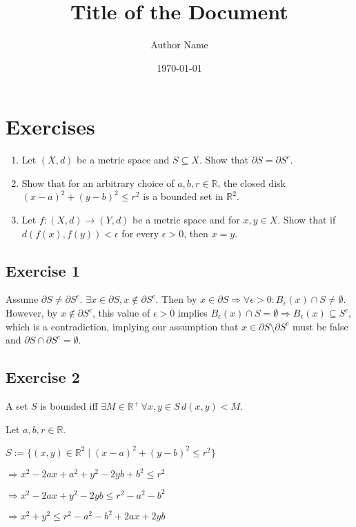 \documentclass{article}
\title{\textbf{Title of the Document}}
\author{Author Name}
\date{\today}
\theoremstyle{definition}
\numberwithin{equation}{section}
\begin{document}
\maketitle
\tableofcontents
\newpage
\section{Exercises}
\begin{enumerate}
    \item Let $(X,d)$ be a metric space and $S \subseteq X$. Show that $\partial S = \partial S^c$.
    \item Show that for an arbitrary choice of \(a, b, r \in \mathbb{R}\), the closed disk \((x - a)^2 + (y - b)^2 \le r^2\) is a bounded set in \(\mathbb{R}^2\).
    \item Let $f:(X,d) \to (Y,d)$ be a metric space and for \(x,y \in X\). Show that if $d(f(x), f(y)) < \epsilon$ for every \(\epsilon > 0\), then \( x = y\).
\end{enumerate}

\subsection*{Exercise 1}
Assume $\partial S \neq \partial S^c$. $\exists x \in \partial S, x \notin \partial S^c$. Then by \(x \in \partial S \Rightarrow \forall \epsilon > 0: B_\epsilon(x) \cap S \neq \emptyset \). However, by \(x \notin \partial S^c\), this value of \(\epsilon > 0\) implies \(B_\epsilon(x) \cap S = \emptyset \Rightarrow B_\epsilon(x) \subseteq S^c\), which is a contradiction, implying our assumption that $x \in \partial S \setminus \partial S^c$ must be false and $\partial S \cap \partial S^c = \emptyset$.

\subsection*{Exercise 2}
A set \(S\) is bounded iff \(\exists M \in \mathbb{R}^+ \, \forall x,y \in S \, d(x,y) < M\).

Let \(a, b, r \in \mathbb{R}\). 

$
S := \{(x,y) \in \mathbb{R}^2 \mid (x-a)^2 + (y-b)^2 \leq r^2\}
$

$
\Rightarrow x^2 - 2ax + a^2 + y^2 - 2yb + b^2 \le r^2 
$

$
\Rightarrow x^2 - 2ax + y^2 - 2yb \le r^2 - a^2 - b^2
$

$
\Rightarrow x^2 + y^2 \le r^2 - a^2 - b^2 + 2ax + 2yb
$
\end{document}
